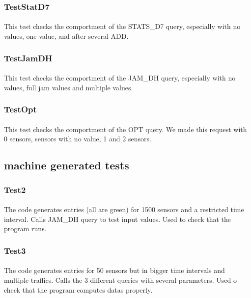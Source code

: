 \subsubsection{TestStatD7}
\paragraph{}
This test checks the comportment of the STATS\_D7 query, especially with no values, one value, and after several ADD.

\subsubsection{TestJamDH}
\paragraph{}
This test checks the comportment of the JAM\_DH query, especially with no values, full jam values and multiple values.

\subsubsection{TestOpt}
\paragraph{}
This test checks the comportment of the OPT query. We made this request with 0 sensors, sensors with no value, 1 and 2 sensors.


\subsection{machine generated tests}

\subsubsection{Test2}
\paragraph{}
The code generates entries (all are green) for 1500 sensors and a restricted time interval. Calls JAM\_DH query to test input values. Used to check that the program runs.

\subsubsection{Test3}
\paragraph{}
The code generates entries for 50 sensors but in bigger time intervals and multiple traffics. Calls the 3 different queries with several parameters. Used o check that the program computes datas properly.

